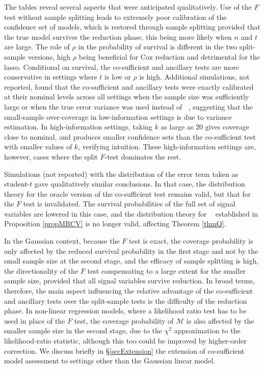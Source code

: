 \documentclass[10pt, reqno]{amsart}
\numberwithin{equation}{section}
\newcommand{\mrcv}{\mathop{\hat{\sigma}^2_{\mathrm{mrcv}}}}
\begin{document}
The tables reveal several aspects that were anticipated qualitatively. Use of the $F$ test without sample splitting leads to extremely poor calibration of the confidence set of models, which is restored through sample splitting provided that the true model survives the reduction phase, this being more likely when $n$ and $t$ are large. The role of $\rho$ in the probability of survival is different in the two split-sample versions, high $\rho$ being beneficial for Cox reduction and detrimental for the lasso. Conditional on survival, the co-sufficient and ancillary tests are more conservative in settings where $t$ is low or $\rho$ is high. Additional simulations, not reported, found that the co-sufficient and ancillary tests were exactly calibrated at their nominal levels across all settings when the sample size was sufficiently large or when the true error variance was used instead of $\mrcv$, suggesting that the small-sample over-coverage in low-information settings is due to variance estimation. In high-information settings, taking $k$ as large as 20 gives coverage close to nominal, and produces smaller confidence sets than the co-sufficient test with smaller values of $k$, verifying intuition. These high-information settings are, however, cases where the split $F$-test dominates the rest. 

Simulations (not reported) with the distribution of the error term taken as student-$t$ gave qualitatively similar conclusions. In that case, the distribution theory for the oracle version of the co-sufficient test remains valid, but that for the $F$ test is invalidated. The survival probabilities of the full set of signal variables are lowered in this case, and the distribution theory for $\mrcv$ established in Proposition \ref{propMRCV} is no longer valid, affecting Theorem \ref{thmQ}.

In the Gaussian context, because the $F$ test is exact, the coverage probability is only affected by the reduced survival probability in the first stage and not by the small sample size at the second stage, and the efficacy of sample splitting is high, the directionality of the $F$ test compensating to a large extent for the smaller sample size, provided that all signal variables survive reduction. In broad terms, therefore, the main aspect influencing the relative advantage of the co-sufficient and ancillary tests over the split-sample tests is the difficulty of the reduction phase. In non-linear regression models, where a likelihood ratio test has to be used in place of the $F$ test, the coverage probability of $\mathcal{M}$ is also affected by the smaller sample size in the second stage, due to the $\chi^2$ approximation to the likelihood-ratio statistic, although this too could be improved by higher-order correction. We discuss briefly in \S \ref{secExtension} the extension of co-sufficient model assessment to settings other than the Gaussian linear model.
\end{document}
